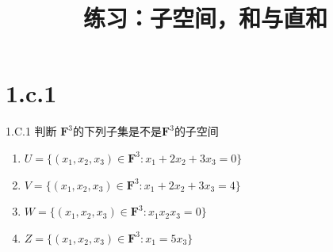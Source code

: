 \documentclass[10pt,a4paper,UTF8]{article}
\date{}
\title{练习：子空间，和与直和}
\begin{document}
\maketitle
\tableofcontents
{}

\section*{1.c.1}
\label{sec:org0c989e6}

\begin{problem}
1.C.1 判断 \(\mathbf{F}^{3}\)的下列子集是不是\(\mathbf{F}^{3}\)的子空间
\begin{enumerate}
\item \label{orgcfdd0be} \(U=\{(x_{1},x_{2},x_{3})\in \mathbf{F}^{3}: x_{1} + 2x_{2} + 3x_{3} = 0\}\)
\item \label{orga1a8fae} \(V=\{(x_{1},x_{2},x_{3})\in \mathbf{F}^{3}: x_{1} + 2x_{2} + 3x_{3} = 4\}\)
\item \label{orgb355b8a} \(W=\{(x_{1},x_{2},x_{3})\in \mathbf{F}^{3}: x_{1} x_{2}x_{3} = 0\}\)
\item \label{org8d51ca5} \(Z=\{(x_{1},x_{2},x_{3})\in \mathbf{F}^{3}: x_{1}  = 5x_{3}\}\)
\end{enumerate}
\end{problem}
\end{document}
